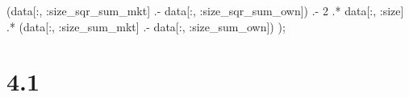 \documentclass[
  letterpaper,
  DIV=11,
  numbers=noendperiod]{scrreprt}
\newenvironment{Shaded}{\begin{snugshade}}{\end{snugshade}}
\newcommand{\FloatTok}[1]{\textcolor[rgb]{0.68,0.00,0.00}{#1}}
\newcommand{\NormalTok}[1]{\textcolor[rgb]{0.00,0.23,0.31}{#1}}
\newcommand{\OperatorTok}[1]{\textcolor[rgb]{0.37,0.37,0.37}{#1}}
\begin{document}
\begin{Shaded}
\begin{Highlighting}[]
\NormalTok{    (data[}\OperatorTok{:}\NormalTok{, }\OperatorTok{:}\NormalTok{size\_sqr\_sum\_mkt] }\OperatorTok{.{-}}\NormalTok{ data[}\OperatorTok{:}\NormalTok{, }\OperatorTok{:}\NormalTok{size\_sqr\_sum\_own]) }\OperatorTok{.{-}} 
    \FloatTok{2} \OperatorTok{.*}\NormalTok{ data[}\OperatorTok{:}\NormalTok{, }\OperatorTok{:}\NormalTok{size] }\OperatorTok{.*}\NormalTok{ (data[}\OperatorTok{:}\NormalTok{, }\OperatorTok{:}\NormalTok{size\_sum\_mkt] }\OperatorTok{.{-}}\NormalTok{ data[}\OperatorTok{:}\NormalTok{, }\OperatorTok{:}\NormalTok{size\_sum\_own])}
\NormalTok{);}
\end{Highlighting}
\end{Shaded}

\hypertarget{section}{%
\section{4.1}\label{section}}
\end{document}
